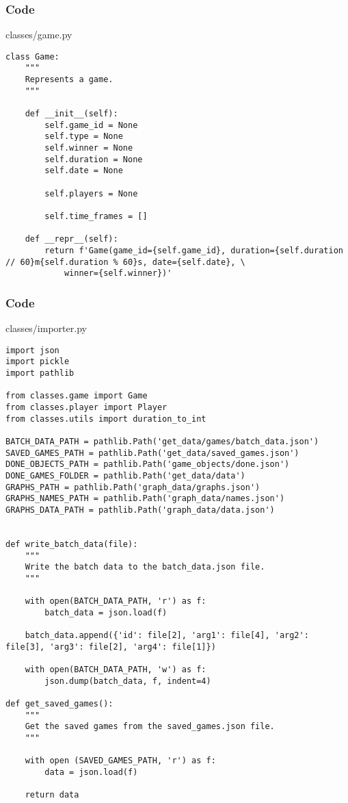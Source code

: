 \documentclass{beamer}
\begin{document}

\begin{frame}[t, fragile]
    \frametitle{Code}
    \scriptsize
    classes/game.py \newline
    \fontsize{3pt}{5pt}\selectfont
    \begin{verbatim}
class Game:
    """
    Represents a game.
    """
    
    def __init__(self):
        self.game_id = None
        self.type = None
        self.winner = None
        self.duration = None
        self.date = None

        self.players = None

        self.time_frames = []

    def __repr__(self):
        return f'Game(game_id={self.game_id}, duration={self.duration // 60}m{self.duration % 60}s, date={self.date}, \
            winner={self.winner})'
    \end{verbatim}
\end{frame}


\begin{frame}[fragile]
    \frametitle{Code}
    \scriptsize
    classes/importer.py \newline
    \fontsize{3pt}{5pt}\selectfont
    \begin{verbatim}
import json
import pickle
import pathlib

from classes.game import Game
from classes.player import Player
from classes.utils import duration_to_int

BATCH_DATA_PATH = pathlib.Path('get_data/games/batch_data.json')
SAVED_GAMES_PATH = pathlib.Path('get_data/saved_games.json')
DONE_OBJECTS_PATH = pathlib.Path('game_objects/done.json')
DONE_GAMES_FOLDER = pathlib.Path('get_data/data')
GRAPHS_PATH = pathlib.Path('graph_data/graphs.json')
GRAPHS_NAMES_PATH = pathlib.Path('graph_data/names.json')
GRAPHS_DATA_PATH = pathlib.Path('graph_data/data.json')


def write_batch_data(file):
    """
    Write the batch data to the batch_data.json file.
    """
    
    with open(BATCH_DATA_PATH, 'r') as f:
        batch_data = json.load(f)
        
    batch_data.append({'id': file[2], 'arg1': file[4], 'arg2': file[3], 'arg3': file[2], 'arg4': file[1]})

    with open(BATCH_DATA_PATH, 'w') as f:
        json.dump(batch_data, f, indent=4)

def get_saved_games():
    """
    Get the saved games from the saved_games.json file.
    """

    with open (SAVED_GAMES_PATH, 'r') as f:
        data = json.load(f)

    return data
    \end{verbatim}
\end{frame}
\end{document}
